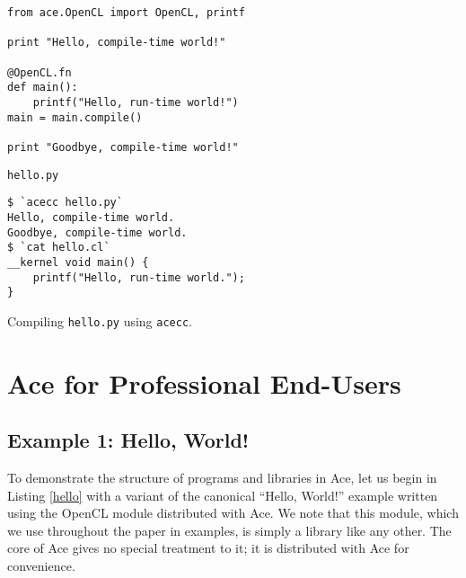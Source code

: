 \documentclass[10pt, conference, compsocconf]{IEEEtran}
\begin{document}
\begin{codelisting}
\begin{lstlisting}
from ace.OpenCL import OpenCL, printf
 
print "Hello, compile-time world!"
 
@OpenCL.fn
def main():
    printf("Hello, run-time world!")
main = main.compile()

print "Goodbye, compile-time world!"
\end{lstlisting}
\caption{\texttt{hello.py}}
\label{hello}
\end{codelisting}
\begin{codelisting}
\begin{lstlisting}[style=Bash]
$ `acecc hello.py`
Hello, compile-time world.
Goodbye, compile-time world.
$ `cat hello.cl`
__kernel void main() {
    printf("Hello, run-time world.");
}\end{lstlisting}
\caption{Compiling \texttt{hello.py} using \texttt{acecc}.}
\label{helloout}
\end{codelisting}

\section{Ace for Professional End-Users}
\subsection{Example 1: Hello, World!}
To demonstrate the structure of programs and libraries in Ace, let us begin in Listing \ref{hello} with a variant of the canonical ``Hello, World!'' example written using the OpenCL module distributed with Ace. We note that this module, which we use throughout the paper in examples, is simply a library like any other. The core of Ace gives no special treatment to it; it is distributed with Ace for convenience.
\end{document}
